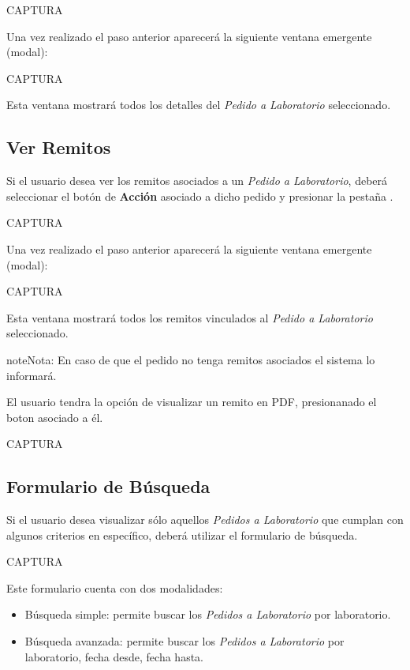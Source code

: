 \documentclass[a4paper,10pt,spanish]{sphinxmanual}
\begin{document}
CAPTURA

Una vez realizado el paso anterior aparecerá la siguiente ventana emergente (modal):

CAPTURA

Esta ventana mostrará todos los detalles del \emph{Pedido a Laboratorio} seleccionado.


\subsection{Ver Remitos}
\label{pedidosalab:ver-remitos}\label{pedidosalab:ver-remitos-pl}
Si el usuario desea ver los remitos asociados a un \emph{Pedido a Laboratorio}, deberá seleccionar el botón de \textbf{Acción} asociado a dicho pedido y presionar la pestaña .

CAPTURA

Una vez realizado el paso anterior aparecerá la siguiente ventana emergente (modal):

CAPTURA

Esta ventana mostrará todos los remitos vinculados al \emph{Pedido a Laboratorio} seleccionado.

\begin{notice}{note}{Nota:}
En caso de que el pedido no tenga remitos asociados el sistema lo informará.
\end{notice}

El usuario tendra la opción de visualizar un remito en PDF, presionanado el boton  asociado a él.

CAPTURA


\subsection{Formulario de Búsqueda}
\label{pedidosalab:formulario-de-busqueda}\label{pedidosalab:formulario-busqueda-pl}
Si el usuario desea visualizar sólo aquellos \emph{Pedidos a Laboratorio} que cumplan con algunos criterios en específico, deberá utilizar el formulario de búsqueda.

CAPTURA

Este formulario cuenta con dos modalidades:
\begin{itemize}
\item {} 
Búsqueda simple: permite buscar los \emph{Pedidos a Laboratorio} por laboratorio.

\item {} 
Búsqueda avanzada: permite buscar los \emph{Pedidos a Laboratorio} por laboratorio, fecha desde, fecha hasta.

\end{itemize}
\end{document}
